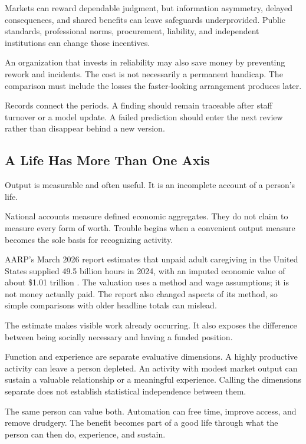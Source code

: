 \documentclass[11pt,openany]{book}
\begin{document}
Markets can reward dependable judgment, but information asymmetry, delayed consequences, and shared benefits can leave safeguards underprovided. Public standards, professional norms, procurement, liability, and independent institutions can change those incentives.

An organization that invests in reliability may also save money by preventing rework and incidents. The cost is not necessarily a permanent handicap. The comparison must include the losses the faster-looking arrangement produces later.

Records connect the periods. A finding should remain traceable after staff turnover or a model update. A failed prediction should enter the next review rather than disappear behind a new version.

\subsection{A Life Has More Than One Axis}

Output is measurable and often useful. It is an incomplete account of a person's life.

National accounts measure defined economic aggregates. They do not claim to measure every form of worth. Trouble begins when a convenient output measure becomes the sole basis for recognizing activity.

AARP's March 2026 report estimates that unpaid adult caregiving in the United States supplied 49.5 billion hours in 2024, with an imputed economic value of about \$1.01 trillion \cite{aarp2026valuing}. The valuation uses a method and wage assumptions; it is not money actually paid. The report also changed aspects of its method, so simple comparisons with older headline totals can mislead.

The estimate makes visible work already occurring. It also exposes the difference between being socially necessary and having a funded position.

Function and experience are separate evaluative dimensions. A highly productive activity can leave a person depleted. An activity with modest market output can sustain a valuable relationship or a meaningful experience. Calling the dimensions separate does not establish statistical independence between them.

The same person can value both. Automation can free time, improve access, and remove drudgery. The benefit becomes part of a good life through what the person can then do, experience, and sustain.
\end{document}
